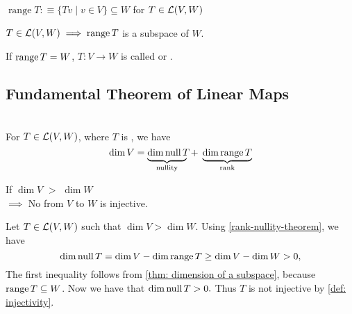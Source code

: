 \setcounter{thm}{15}
\begin{mydef} [range]
  $\operatorname{range}T :\equiv \{Tv \mid v \in V\} \subseteq W$ for $T \in {\mathcal{L}(V,W)}$
\end{mydef}

\setcounter{thm}{17}
\begin{thm} 
  \label{thm: the range is a subspace}
  $T\in \mathcal{L}(V,W) \implies \operatorname{range} T$ is a subspace of $W$.
\end{thm}

\setcounter{thm}{18}
\begin{mydef} [surjectivity]
  \label{def: surjectivity}
  If $\operatorname{range} T=W$, $T:V\to W$ is called  or .
\end{mydef}

\subsection{Fundamental Theorem of Linear Maps}

  \setcounter{thm}{20}
  \begin{thm} 
    \label{rank-nullity-theorem}
    \phantom{.} \\
    For $T \in \mathcal{L}(V,W)$, where $T$ is \fd, we have
    \begin{equation}
      \dim V =
      \underbrace{ \dim\operatorname{null} T\phantom{g}\!\!\!\!\!}_{\text{nullity}}
      \; + \; \underbrace{\dim \operatorname{range} T}_{\text{rank}}
    \end{equation}
  \end{thm}

  \setcounter{thm}{21}
  \begin{thm} 
    \label{thm: linear-map-to-a-lower-dimensional-space-is-not-injective}
    If $\dim V$ $>$ $\dim W$ \\
    $\implies$ No \lm from $V$ to $W$ is injective.
  \end{thm}
  \begin{prf} Let $T\in \mathcal{L}(V,W)$ such that $\dim V > \dim W$. Using \ref{rank-nullity-theorem}, we have
    \begin{equation}
      \dim \operatorname{null} T = \dim V - \dim \operatorname{range} T \geq \dim V - \dim W > 0,
    \end{equation}
    The first inequality follows from \ref{thm: dimension of a subspace}, because $\operatorname{range} T \subseteq W$. Now we have that $\dim \operatorname{null} T > 0.$ Thus $T$ is not injective by \ref{def: injectivity}.
  \end{prf}

